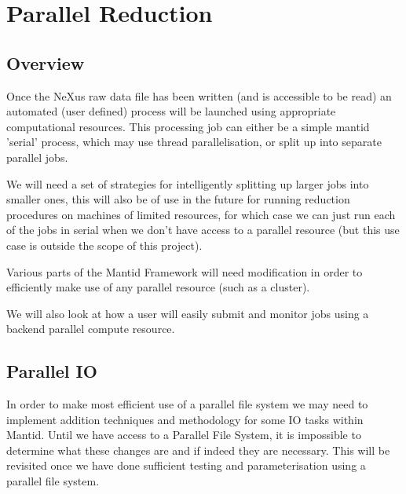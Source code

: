 \section{Parallel Reduction}


\subsection{Overview}

Once the NeXus raw data file has been written (and is accessible to be read) an automated (user defined) process will be launched using appropriate computational resources.  This processing job can either be a simple mantid 'serial' process, which may use thread parallelisation, or split up into separate parallel jobs.  

We will need a set of strategies for intelligently splitting up larger jobs into smaller ones, this will also be of use in the future for running reduction procedures on machines of limited resources, for which case we can just run each of the jobs in serial when we don't have access to a parallel resource (but this use case is outside the scope of this project).

Various parts of the Mantid Framework will need modification in order to efficiently make use of any parallel resource (such as a cluster).  

We will also look at how a user will easily submit and monitor jobs using a backend parallel compute resource.











\subsection{Parallel IO}

In order to make most efficient use of a parallel file system we may need to implement addition techniques and methodology for some IO tasks within Mantid.  Until we have access to a Parallel File System, it is impossible to determine what these changes are and if indeed they are necessary.  
This will be revisited once we have done sufficient testing and parameterisation using a parallel file system.

